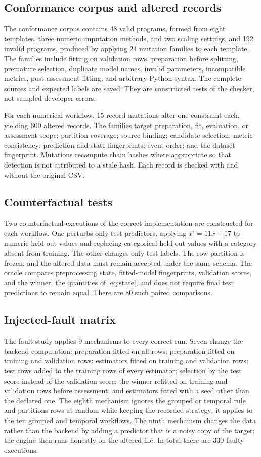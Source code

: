 \documentclass[lettersize,journal]{IEEEtran}
\begin{document}
\subsection{Conformance corpus and altered records}
The conformance corpus contains 48 valid programs, formed from eight templates, three numeric imputation methods, and two scaling settings, and 192 invalid programs, produced by applying 24 mutation families to each template. The families include fitting on validation rows, preparation before splitting, premature selection, duplicate model names, invalid parameters, incompatible metrics, post-assessment fitting, and arbitrary Python syntax. The complete sources and expected labels are saved. They are constructed tests of the checker, not sampled developer errors.

For each numerical workflow, 15 record mutations alter one constraint each, yielding 600 altered records. The families target preparation, fit, evaluation, or assessment scope; partition coverage; source binding; candidate selection; metric consistency; prediction and state fingerprints; event order; and the dataset fingerprint. Mutations recompute chain hashes where appropriate so that detection is not attributed to a stale hash. Each record is checked with and without the original CSV.

\subsection{Counterfactual tests}
Two counterfactual executions of the correct implementation are constructed for each workflow. One perturbs only test predictors, applying $x'=11x+17$ to numeric held-out values and replacing categorical held-out values with a category absent from training. The other changes only test labels. The row partition is frozen, and the altered data must remain accepted under the same schema. The oracle compares preprocessing state, fitted-model fingerprints, validation scores, and the winner, the quantities of \eqref{eq:state}, and does not require final test predictions to remain equal. There are 80 such paired comparisons.

\subsection{Injected-fault matrix}\label{sec:faultmethod}
The fault study applies 9 mechanisms to every correct run. Seven change the backend computation: preparation fitted on all rows; preparation fitted on training and validation rows; estimators fitted on training and validation rows; test rows added to the training rows of every estimator; selection by the test score instead of the validation score; the winner refitted on training and validation rows before assessment; and estimators fitted with a seed other than the declared one. The eighth mechanism ignores the grouped or temporal rule and partitions rows at random while keeping the recorded strategy; it applies to the ten grouped and temporal workflows. The ninth mechanism changes the data rather than the backend by adding a predictor that is a noisy copy of the target; the engine then runs honestly on the altered file. In total there are 330 faulty executions.
\end{document}
